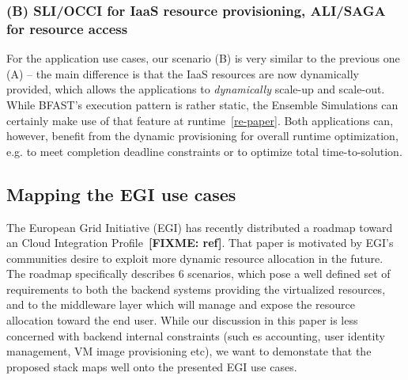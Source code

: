 \documentclass[10pt,conference,final,letterpaper,twoside,twocolumn,]{IEEEtran}
\newcommand{\I}[1]{\textit{#1}}
\newcommand{\B}[1]{\textbf{#1}}
\newcommand{\F}[1]{\B{[FIXME: #1]}}
\begin{document}
 \subsubsection*{(B) SLI/OCCI for IaaS resource provisioning, ALI/SAGA for
 resource access} 

 For the application use cases, our scenario (B) is very similar to
 the previous one (A) -- the main difference is that the IaaS
 resources are now dynamically provided, which allows the applications
 to \I{dynamically} scale-up and scale-out.  While BFAST's execution
 pattern is rather static, the Ensemble Simulations can certainly make
 use of that feature at runtime~\ref{re-paper}.  Both applications
 can, however, benefit from the dynamic provisioning for overall
 runtime optimization, e.g. to meet completion deadline constraints or
 to optimize total time-to-solution.





 \subsection{Mapping the EGI use cases}

 The European Grid Initiative (EGI) has recently distributed a roadmap
 toward an Cloud Integration Profile~\F{ref}.  That paper is motivated
 by EGI's communities desire to exploit more dynamic resource
 allocation in the future.  The roadmap specifically describes 6
 scenarios, which pose a well defined set of requirements to both the
 backend systems providing the virtualized resources, and to the
 middleware layer which will manage and expose the resource
 allocation toward the end user.  While our discussion in this paper
 is less concerned with backend internal constraints (such es
 accounting, user identity management, VM image provisioning etc), we
 want to demonstate that the proposed stack maps well onto the
 presented EGI use cases.\\
\end{document}
